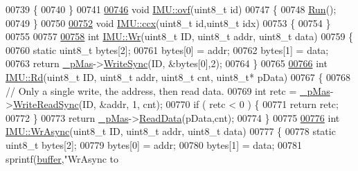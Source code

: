 \begin{DoxyCode}
{{{{00739 \{
00740 \}
00741 
\hypertarget{_i_m_u_8cpp_source_l00746}{}\hyperlink{class_i_m_u_aefbd4e2f7f3928cf44c00a96d61c3546}{00746} \textcolor{keywordtype}{void} \hyperlink{class_i_m_u_aefbd4e2f7f3928cf44c00a96d61c3546}{IMU::ovf}(uint8\_t \textcolor{keywordtype}{id})
00747 \{
00748     \hyperlink{class_i_m_u_aadf38b912ad23374c4ee8e40fb9f3638}{Run}();
00749 \}
00750 
\hypertarget{_i_m_u_8cpp_source_l00752}{}\hyperlink{class_i_m_u_ad2215ab5585c1f9512b91ef309dabf88}{00752} \textcolor{keywordtype}{void} \hyperlink{class_i_m_u_ad2215ab5585c1f9512b91ef309dabf88}{IMU::ccx}(uint8\_t \textcolor{keywordtype}{id},uint8\_t idx)
00753 \{
00754 \}
00755 
00757 
\hypertarget{_i_m_u_8cpp_source_l00758}{}\hyperlink{class_i_m_u_af80eef2eb22d08faf697dd708b18303c}{00758} \textcolor{keywordtype}{int} \hyperlink{class_i_m_u_af80eef2eb22d08faf697dd708b18303c}{IMU::Wr}(uint8\_t ID, uint8\_t addr, uint8\_t data)
00759 \{
00760     \textcolor{keyword}{static} uint8\_t  bytes[2];
00761     bytes[0] = addr;
00762     bytes[1] = data;
00763     \textcolor{keywordflow}{return} \hyperlink{class_i_m_u_a466148932203b7250c83a4c5bb684ca1}{_pMas}->\hyperlink{class_i2_c___master_af6f8c139ec849d0b7a443269ccf52bfe}{WriteSync}(ID, &bytes[0],2);
00764 \}
00765 
\hypertarget{_i_m_u_8cpp_source_l00766}{}\hyperlink{class_i_m_u_ab6c8ef618465524c88a021e2206b2de5}{00766} \textcolor{keywordtype}{int} \hyperlink{class_i_m_u_ab6c8ef618465524c88a021e2206b2de5}{IMU::Rd}(uint8\_t ID, uint8\_t addr, uint8\_t cnt, uint8\_t* pData)
00767 \{
00768     \textcolor{comment}{// Only a single write, the address, then read data.}
00769     \textcolor{keywordtype}{int} retc = \hyperlink{class_i_m_u_a466148932203b7250c83a4c5bb684ca1}{_pMas}->\hyperlink{class_i2_c___master_a38281efa723712f59d609e2362d124ed}{WriteReadSync}(ID, &addr, 1, cnt);
00770     \textcolor{keywordflow}{if} ( retc < 0 ) \{
00771         \textcolor{keywordflow}{return} retc;
00772     \}
00773     \textcolor{keywordflow}{return} \hyperlink{class_i_m_u_a466148932203b7250c83a4c5bb684ca1}{_pMas}->\hyperlink{class_i2_c___master_ab7c8dd50c0e931fb20a73e42b2c2202a}{ReadData}(pData,cnt);
00774 \}
00775 
\hypertarget{_i_m_u_8cpp_source_l00776}{}\hyperlink{class_i_m_u_a2c38589ebcb357dfc8f987a5d41c845b}{00776} \textcolor{keywordtype}{int} \hyperlink{class_i_m_u_a2c38589ebcb357dfc8f987a5d41c845b}{IMU::WrAsync}(uint8\_t ID, uint8\_t addr, uint8\_t data)
00777 \{
00778     \textcolor{keyword}{static} uint8\_t  bytes[2];
00779     bytes[0] = addr;
00780     bytes[1] = data;
00781     sprintf(\hyperlink{_i_m_u_8cpp_a38e7c3f1ce348a3ed20459d277245263}{buffer},\textcolor{stringliteral}{"WrAsync to %
}}}}}
\end{DoxyCode}
